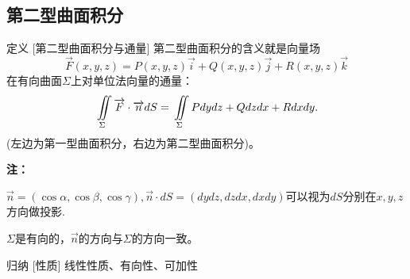 \documentclass[a4paper,12pt,oneside,fontset=none]{ctexbook}
\let\oldiint\iint
\renewcommand{\iint}{\displaystyle{\vrule width 0pt height 0em depth 0em}\oldiint}
\newenvironment{induction}[1][]{\begin{thmBox}{归纳}{#1}}{\end{thmBox}}
\newcounter{definition}[chapter]
\newenvironment{definition}[1][]{\begin{defBox}{定义}{#1}}{\end{defBox}}
\newenvironment{note}{
    \par\vspace{0.5em}\noindent
    \textbf{\color{NoteColor} 注：}
}{
    \par\vspace{0.5em}
}
\numberwithin{equation}{chapter}
\begin{document}
\subsection{第二型曲面积分}
\begin{definition}
    [第二型曲面积分与通量]
    第二型曲面积分的含义就是向量场$$\overrightarrow{F}(x,y,z) = P(x,y,z)\overrightarrow{i} + Q(x,y,z)\overrightarrow{j} + R(x,y,z)\overrightarrow{k}$$在有向曲面$\Sigma$上对单位法向量的通量：
    $$\iint\limits_{\Sigma} \overrightarrow{F} \cdot \overrightarrow{n} dS = \iint\limits_{\Sigma} Pdy dz + Qdz dx + Rdx dy.$$
    (左边为第一型曲面积分，右边为第二型曲面积分)。
\end{definition}
\begin{note}
    $\overrightarrow{n} = (\cos \alpha, \cos \beta, \cos \gamma),\overrightarrow{n}\cdot dS = (dy dz, dz dx, dx dy)$可以视为$dS$分别在$x,y,z$方向做投影.

    $\Sigma$是有向的，$\overrightarrow{n}$的方向与$\Sigma$的方向一致。
\end{note}

\begin{induction}
    [性质]
    线性性质、有向性、可加性
\end{induction}
\end{document}
